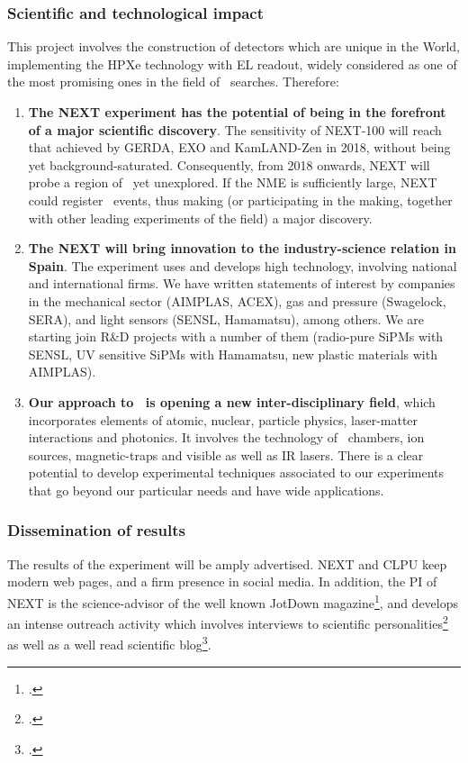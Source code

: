 \subsubsection{Scientific and technological impact}

This project involves the construction of detectors which are unique in the World, implementing the HPXe technology with EL readout, widely considered as one of the most promising ones in the field of \bbonu\ searches. Therefore: 
\begin{enumerate}
\item {\bf The NEXT experiment has the potential of being in the forefront of a major scientific discovery}. The sensitivity of NEXT-100 will reach that achieved by GERDA, EXO and KamLAND-Zen in 2018, without being yet background-saturated. Consequently, from 2018 onwards, NEXT will probe a region of \mbb\ yet unexplored. If the NME is sufficiently large, NEXT could register \bbonu\ events, thus making (or participating in the making, together with other leading experiments of the field) a major discovery.
\item {\bf The NEXT will bring innovation to the industry-science relation in Spain}. The experiment uses and develops high technology, involving national and international firms. We have written statements of interest by companies in the mechanical sector (AIMPLAS, ACEX), gas and pressure (Swagelock, SERA), and light sensors (SENSL, Hamamatsu), among others. We are starting join R\&D  projects with a number of them (radio-pure SiPMs with SENSL, UV sensitive SiPMs with Hamamatsu, new plastic materials with AIMPLAS).  
\item {\bf Our approach to \BATA\ is opening a new inter-disciplinary field}, which incorporates elements of atomic, nuclear, particle physics, laser-matter interactions and photonics. It involves the technology of \HPXE\ chambers, ion sources, magnetic-traps and visible as well as IR lasers. There is a clear potential to develop experimental techniques associated to our experiments that go beyond our particular needs and have wide applications.
\end{enumerate}

\subsubsection{Dissemination of results}

The results of the experiment will be amply advertised. NEXT and CLPU keep modern web pages, and a firm presence in social media. In addition, the PI of NEXT is the science-advisor of the well known JotDown magazine\footcite{JotDown}, and develops an intense outreach activity which involves interviews to scientific personalities\footcite{JotDownNygrenBettini, JotDownCattaiGonzalez, JotDownHalzen} as well as a well read scientific blog\footcite{JotDownBlog}.

